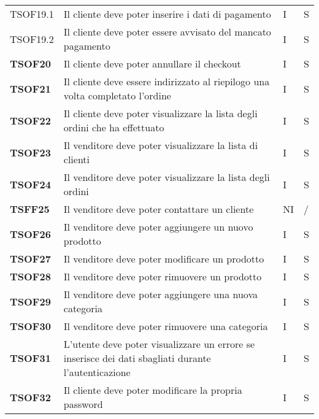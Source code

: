 \begin{center}
\begin{longtable}[!h]{p{60px} p{240px} p{35px} p{35px}}
        TSOF19.1        & Il cliente deve poter inserire i dati di pagamento                                                  & I              & S              \\
        TSOF19.2        & Il cliente deve poter essere avvisato del mancato pagamento                                         & I              & S              \\
        \textbf{TSOF20} & Il cliente deve poter annullare il checkout                                                         & I              & S              \\
        \textbf{TSOF21} & Il cliente deve essere indirizzato al riepilogo una volta completato l'ordine                       & I              & S              \\
        \textbf{TSOF22} & Il cliente deve poter visualizzare la lista degli ordini che ha effettuato                          & I              & S              \\
        \textbf{TSOF23} & Il venditore deve poter visualizzare la lista di clienti                                            & I              & S              \\
        \textbf{TSOF24} & Il venditore deve poter visualizzare la lista degli ordini                                          & I              & S              \\
        \textbf{TSFF25} & Il venditore deve poter contattare un cliente                                                       & NI             & /              \\
        \textbf{TSOF26} & Il venditore deve poter aggiungere un nuovo prodotto                                                & I              & S              \\
        \textbf{TSOF27} & Il venditore deve poter modificare un prodotto                                                      & I              & S              \\
        \textbf{TSOF28} & Il venditore deve poter rimuovere un prodotto                                                       & I              & S              \\
        \textbf{TSOF29} & Il venditore deve poter aggiungere una nuova categoria                                              & I              & S              \\
        \textbf{TSOF30} & Il venditore deve poter rimuovere una categoria                                                     & I              & S              \\
        \textbf{TSOF31} & L'utente deve poter visualizzare un errore se inserisce dei dati sbagliati durante l'autenticazione & I              & S              \\
        \textbf{TSOF32} & Il cliente deve poter modificare la propria password                                                & I              & S              \\
    \end{longtable}
\end{center}
\pagebreak
